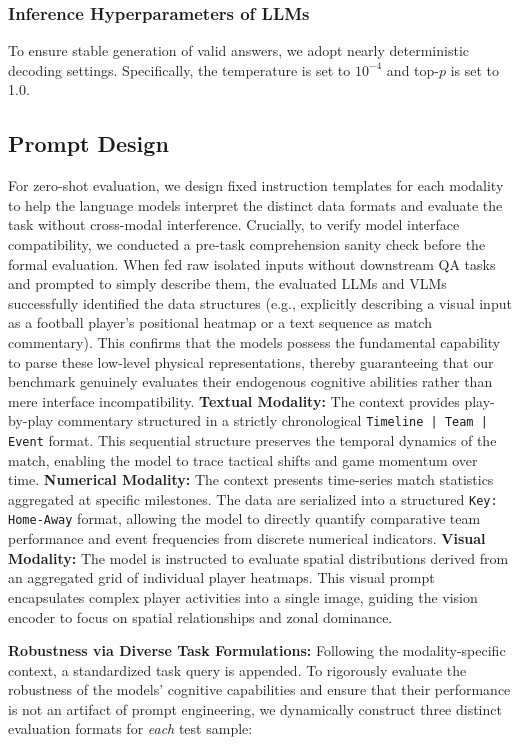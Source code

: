 \subsubsection{Inference Hyperparameters of LLMs}
To ensure stable generation of valid answers, we adopt nearly deterministic decoding settings. Specifically, the temperature is set to $10^{-4}$ and top-$p$ is set to 1.0.



\subsection{Prompt Design}
\label{app:prompts_zeroshot_fewshot}

For zero-shot evaluation, we design fixed instruction templates for each modality to help the language models interpret the distinct data formats and evaluate the task without cross-modal interference. Crucially, to verify model interface compatibility, we conducted a pre-task comprehension sanity check before the formal evaluation. When fed raw isolated inputs without downstream QA tasks and prompted to simply describe them, the evaluated LLMs and VLMs successfully identified the data structures (e.g., explicitly describing a visual input as a football player's positional heatmap or a text sequence as match commentary). This confirms that the models possess the fundamental capability to parse these low-level physical representations, thereby guaranteeing that our benchmark genuinely evaluates their endogenous cognitive abilities rather than mere interface incompatibility. \textbf{Textual Modality:} The context provides play-by-play commentary structured in a strictly chronological \texttt{Timeline | Team | Event} format. This sequential structure preserves the temporal dynamics of the match, enabling the model to trace tactical shifts and game momentum over time. \textbf{Numerical Modality:} The context presents time-series match statistics aggregated at specific milestones. The data are serialized into a structured \texttt{Key: Home-Away} format, allowing the model to directly quantify comparative team performance and event frequencies from discrete numerical indicators. \textbf{Visual Modality:} The model is instructed to evaluate spatial distributions derived from an aggregated grid of individual player heatmaps. This visual prompt encapsulates complex player activities into a single image, guiding the vision encoder to focus on spatial relationships and zonal dominance.

\textbf{Robustness via Diverse Task Formulations:} Following the modality-specific context, a standardized task query is appended. To rigorously evaluate the robustness of the models' cognitive capabilities and ensure that their performance is not an artifact of prompt engineering, we dynamically construct three distinct evaluation formats for \textit{each} test sample: 

